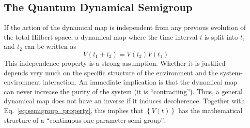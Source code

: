 \subsection{The Quantum Dynamical Semigroup}

If the action of the dynamical map is independent from any previous evolution of
the total Hilbert space, a dynamical map where the time interval $t$ is split
into $t_1$ and $t_2$ can be written as
\begin{equation}
  V(t_1+t_2) = V(t_2) V(t_1)
  \label{eq:semigroup_property}
\end{equation}
This independence property is a strong assumption.
Whether it is justified depends very much on the specific structure of the
environment and the system-environment interaction. An immediate implication
is that the dynamical map can never increase the purity of the
system (it is ``contracting''). Thus, a general dynamical map does not have an
inverse if it induces decoherence. Together with
Eq.~\eqref{eq:semigroup_property}, this implies that $\left\{V(t)\right\}$ has
the mathematical structure of a ``continuous one-parameter semi-group''.

